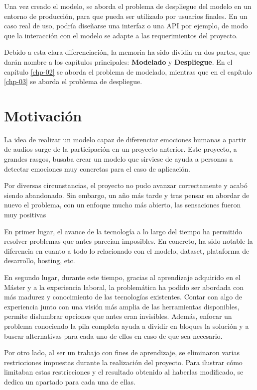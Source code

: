Una vez creado el modelo, se aborda el problema de despliegue del modelo en un entorno de producción, para que pueda ser utilizado por usuarios finales.
En un caso real de uso, podría diseñarse una interfaz o una API por ejemplo, de modo que la interacción con el modelo se adapte a las requerimientos del proyecto.

Debido a esta clara diferenciación, la memoria ha sido dividia en dos partes, que darán nombre a los capítulos principales: \textbf{Modelado} y \textbf{Despliegue}.
En el capítulo \ref{chp-02} se aborda el problema de modelado, mientras que en el capítulo \ref{chp-03} se aborda el problema de despliegue.

\section{Motivación}\label{sec:motivacion}

La idea de realizar un modelo capaz de diferenciar emociones humanas a partir de audios surge de la participación en un proyecto anterior.
Este proyecto, a grandes rasgos, busaba crear un modelo que sirviese de ayuda a personas a detectar emociones muy concretas para el caso de aplicación.

Por diversas circunstancias, el proyecto no pudo avanzar correctamente y acabó siendo abandonado.
Sin embargo, un año más tarde y tras pensar en abordar de nuevo el problema, con un enfoque mucho más abierto, las sensaciones fueron muy positivas

En primer lugar, el avance de la tecnología a lo largo del tiempo ha permitido resolver problemas que antes parecían imposibles.
En concreto, ha sido notable la diferencia en cuanto a todo lo relacionado con el modelo, dataset, plataforma de desarrollo, hosting, etc.

En segundo lugar, durante este tiempo, gracias al aprendizaje adquirido en el Máster y a la experiencia laboral, la problemática ha podido ser abordada con más madurez y conocimiento de las tecnologías existentes.
Contar con algo de experiencia junto con una visión más amplia de las herramientas disponibles, permite dislumbrar opciones que antes eran invisibles.
Además, enfocar un problema conociendo la pila completa ayuda a dividir en bloques la solución y a buscar alternativas para cada uno de ellos en caso de que sea necesario.

Por otro lado, al ser un trabajo con fines de aprendizaje, se eliminaron varias restricciones impuestas durante la realización del proyecto.
Para ilustrar cómo limitaban estas restricciones y el resultado obtenido al haberlas modificado, se dedica un apartado para cada una de ellas.


